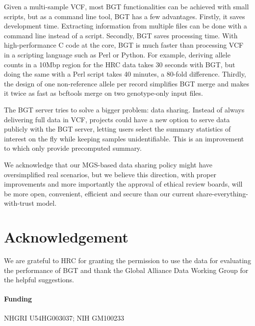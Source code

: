 \documentclass{bioinfo}
\begin{document}
Given a multi-sample VCF, most BGT functionalities can be achieved with small
scripts, but as a command line tool, BGT has a few advantages. Firstly, it
saves development time. Extracting information from multiple files can be done
with a command line instead of a script.  Secondly,
BGT saves processing time. With high-performance C code at the core, BGT is
much faster than processing VCF in a scripting language such as Perl or Python.
For example, deriving allele counts in a 10Mbp region for the HRC data takes 30
seconds with BGT, but doing the same with a Perl script takes 40 minutes, a
80-fold difference. Thirdly, the design of one non-reference allele per record
simplifies BGT merge and makes it twice as fast as bcftools merge on two
genotype-only input files.

The BGT server tries to solve a bigger problem: data sharing. Instead of always
delivering full data in VCF, projects could have a new option to serve data
publicly with the BGT server, letting users select the summary statistics of interest
on the fly while keeping samples unidentifiable. This is an improvement to
\citet{Stade:2014ty} which only provide precomputed summary.


We acknowledge that our MGS-based data sharing policy might have oversimplified
real scenarios, but we believe this direction, with proper improvements and
more importantly the approval of ethical review boards, will be more open,
convenient, efficient and secure than our current
share-everything-with-trust model.

\section*{Acknowledgement}
We are grateful to HRC for granting the permission to use the data for evaluating
the performance of BGT and thank the Global Alliance Data Working Group for the
helpful suggestions.
\paragraph{Funding\textcolon} NHGRI U54HG003037; NIH GM100233


\end{document}
